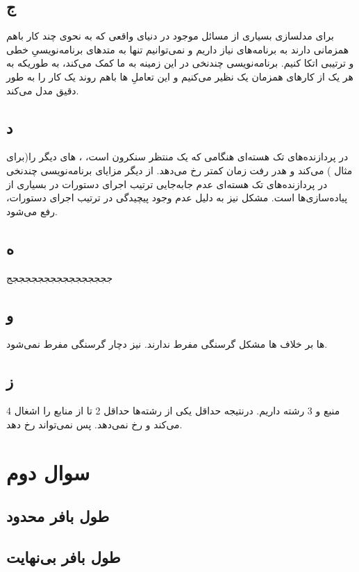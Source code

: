 \documentclass{article}
\begin{document}
\subsection{ج}
برای مدلسازی بسیاری از مسائل موجود در دنیای واقعی که به نحوی چند کار باهم همزمانی دارند به برنامه‌های  نیاز داریم و نمی‌توانیم تنها به متدهای برنامه‌نویسیِ خطی و ترتیبی اتکا کنیم. برنامه‌نویسی چندنخی در این زمینه به ما کمک می‌کند، به طوریکه به هر یک از کارهای همزمان یک  نظیر می‌کنیم و این تعاملِ ها باهم روند یک کار را به طور دقیق مدل می‌کند.
\subsection{د}
در پردازنده‌های تک هسته‌ای هنگامی که یک  منتظر  سنکرون است، ،  های دیگر را(برای مثال )  می‌کند و هدر رفت زمان کمتر رخ می‌دهد. از دیگر مزایای برنامه‌نویسی چندنخی در پردازنده‌های تک هسته‌ای عدم جا‌به‌جایی ترتیب اجرای دستورات در بسیاری از پیاده‌سازی‌ها است. مشکل  نیز به دلیل عدم وجود پیچیدگی در ترتیب اجرای دستورات، رفع می‌شود.
\subsection{ه}
ججججججججججججججججج

\subsection{و}
ها بر خلاف ها مشکل گرسنگی مفرط ندارند.  نیز دچار گرسنگی مفرط نمی‌شود.
\subsection{ز}
4 منبع و 3 رشته داریم. درنتیجه حداقل یکی از رشته‌ها حداقل 2 تا از منابع را اشغال می‌کند و  رخ نمی‌دهد. پس  نمی‌تواند رخ دهد.
\newpage
\section{سوال دوم}
\subsection{طول بافر محدود}
\lr{}
\subsection{طول بافر بی‌نهایت}
\lr{}
\end{document}
